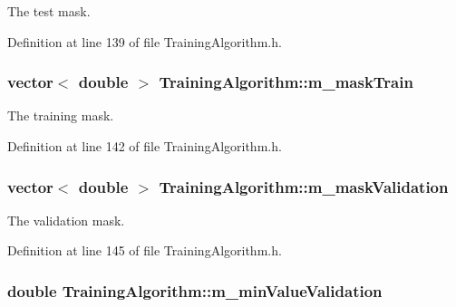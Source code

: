 The test mask. 



Definition at line 139 of file Training\+Algorithm.\+h.

\subsubsection[{\texorpdfstring{m\+\_\+mask\+Train}{m_maskTrain}}]{\setlength{\rightskip}{0pt plus 5cm}vector$<$ double $>$ Training\+Algorithm\+::m\+\_\+mask\+Train\hspace{0.3cm}{\ttfamily [private]}}\hypertarget{classTrainingAlgorithm_a66d4930727c81f03fd28e75eb0c89947}{}\label{classTrainingAlgorithm_a66d4930727c81f03fd28e75eb0c89947}


The training mask. 



Definition at line 142 of file Training\+Algorithm.\+h.

\subsubsection[{\texorpdfstring{m\+\_\+mask\+Validation}{m_maskValidation}}]{\setlength{\rightskip}{0pt plus 5cm}vector$<$ double $>$ Training\+Algorithm\+::m\+\_\+mask\+Validation\hspace{0.3cm}{\ttfamily [private]}}\hypertarget{classTrainingAlgorithm_a92a2cee29169fb2e4d92089ffcd2f73b}{}\label{classTrainingAlgorithm_a92a2cee29169fb2e4d92089ffcd2f73b}


The validation mask. 



Definition at line 145 of file Training\+Algorithm.\+h.

\subsubsection[{\texorpdfstring{m\+\_\+min\+Value\+Validation}{m_minValueValidation}}]{\setlength{\rightskip}{0pt plus 5cm}double Training\+Algorithm\+::m\+\_\+min\+Value\+Validation\hspace{0.3cm}{\ttfamily [private]}}\hypertarget{classTrainingAlgorithm_a317c3e0ba32fa6984f8dece4bafa0ae6}{}\label{classTrainingAlgorithm_a317c3e0ba32fa6984f8dece4bafa0ae6}


